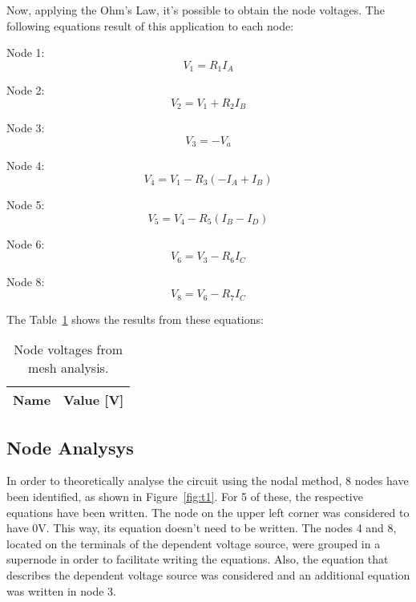 Now, applying the Ohm's Law, it's possible to obtain the node voltages. The following equations result of this application to each node: \vspace{4mm}

Node 1:
\begin{equation}
  V_1 = R_1I_A
  \label{eq:V1}
\end{equation}

Node 2:
\begin{equation}
  V_2 = V_1+R_2I_B
  \label{eq:V2}
\end{equation}

Node 3:
\begin{equation}
  V_3 = -V_a
  \label{eq:V3}
\end{equation}

Node 4:
\begin{equation}
  V_4 = V_1 - R_3(-I_A+I_B)
  \label{eq:V4}
\end{equation}

Node 5:
\begin{equation}
  V_5 = V_4 - R_5(I_B-I_D)
  \label{eq:V5}
\end{equation}

Node 6:
\begin{equation}
  V_6 = V_3 - R_6I_C
  \label{eq:V6}
\end{equation}

Node 8:
\begin{equation}
  V_8 = V_6 - R_7I_C
  \label{eq:V8}
\end{equation}

The Table~\ref{tab:meshV} shows the results from these equations:

\begin{table}[h]
  \centering
  \begin{tabular}{|l|r|}
    \hline    
    {\bf Name} & {\bf Value [V]} \\ \hline
    
  \end{tabular}
  \caption{Node voltages from mesh analysis.}
  \label{tab:meshV}
\end{table}


\subsection{Node Analysys}

In order to theoretically analyse the circuit using the nodal method, 
8 nodes have been identified, as shown in Figure~\ref{fig:t1}. For 5 of these, the respective equations have been written. 
The node on the upper left corner was considered to have 0V. 
This way, its equation doesn't need to be written. 
The nodes 4 and 8, located on the terminals of the dependent voltage source, were grouped in a supernode in order to facilitate writing the equations. 
Also, the equation that describes the dependent voltage source was considered and an additional equation was written in node 3.


